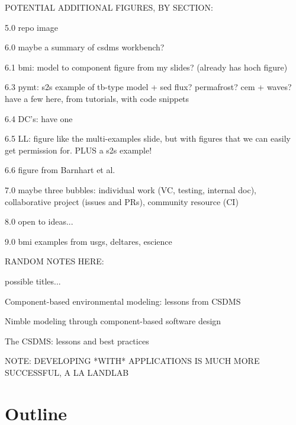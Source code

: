 \documentclass[12pt]{amsart}
\begin{document}
\newpage

POTENTIAL ADDITIONAL FIGURES, BY SECTION:

5.0 repo image

6.0 maybe a summary of csdms workbench?

6.1 bmi: model to component figure from my slides? (already has hoch figure)

6.3 pymt: s2s example of tb-type model + sed flux? permafrost? cem + waves? have a few here, from tutorials, with code snippets

6.4 DC's: have one

6.5 LL: figure like the multi-examples slide, but with figures that we can easily get permission for. PLUS a s2s example!

6.6 figure from Barnhart et al.

7.0 maybe three bubbles: individual work (VC, testing, internal doc), collaborative project (issues and PRs), community resource (CI)

8.0 open to ideas...

9.0 bmi examples from usgs, deltares, escience







RANDOM NOTES HERE:

possible titles...

Component-based environmental modeling: lessons from CSDMS

Nimble modeling through component-based software design

The CSDMS: lessons and best practices



NOTE: DEVELOPING *WITH* APPLICATIONS IS MUCH MORE SUCCESSFUL, A LA LANDLAB




\section*{Outline}
\end{document}
